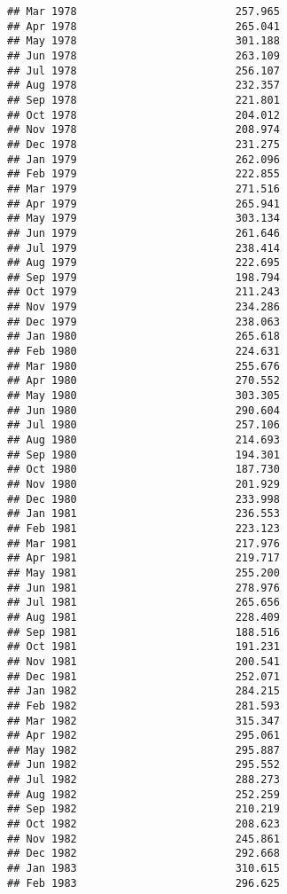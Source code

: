 \documentclass[
]{article}
\begin{document}
\begin{verbatim}
## Mar 1978                         257.965
## Apr 1978                         265.041
## May 1978                         301.188
## Jun 1978                         263.109
## Jul 1978                         256.107
## Aug 1978                         232.357
## Sep 1978                         221.801
## Oct 1978                         204.012
## Nov 1978                         208.974
## Dec 1978                         231.275
## Jan 1979                         262.096
## Feb 1979                         222.855
## Mar 1979                         271.516
## Apr 1979                         265.941
## May 1979                         303.134
## Jun 1979                         261.646
## Jul 1979                         238.414
## Aug 1979                         222.695
## Sep 1979                         198.794
## Oct 1979                         211.243
## Nov 1979                         234.286
## Dec 1979                         238.063
## Jan 1980                         265.618
## Feb 1980                         224.631
## Mar 1980                         255.676
## Apr 1980                         270.552
## May 1980                         303.305
## Jun 1980                         290.604
## Jul 1980                         257.106
## Aug 1980                         214.693
## Sep 1980                         194.301
## Oct 1980                         187.730
## Nov 1980                         201.929
## Dec 1980                         233.998
## Jan 1981                         236.553
## Feb 1981                         223.123
## Mar 1981                         217.976
## Apr 1981                         219.717
## May 1981                         255.200
## Jun 1981                         278.976
## Jul 1981                         265.656
## Aug 1981                         228.409
## Sep 1981                         188.516
## Oct 1981                         191.231
## Nov 1981                         200.541
## Dec 1981                         252.071
## Jan 1982                         284.215
## Feb 1982                         281.593
## Mar 1982                         315.347
## Apr 1982                         295.061
## May 1982                         295.887
## Jun 1982                         295.552
## Jul 1982                         288.273
## Aug 1982                         252.259
## Sep 1982                         210.219
## Oct 1982                         208.623
## Nov 1982                         245.861
## Dec 1982                         292.668
## Jan 1983                         310.615
## Feb 1983                         296.625

\end{verbatim}
\end{document}
